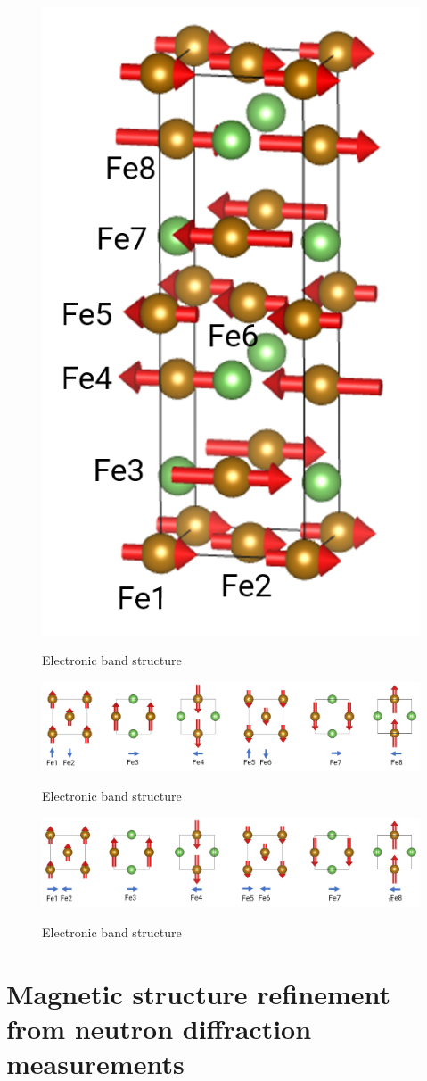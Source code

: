 \documentclass[11pt,edeposit,draftthesis]{uiucthesis2020}
\begin{document}
\begin{mainmatter}
\begin{figure}
\centering\includegraphics[width=0.3\columnwidth]{figures/ch2/Fe2As.png} \\
\caption{\label{fig:Fe2As}
Electronic band structure
}
\end{figure}

\begin{figure}
\centering\includegraphics[width=\columnwidth]{figures/ch2/fieldlike_torque_Fe2As.png} \\
\caption{\label{fig:fieldlike_torque_Fe2As}
Electronic band structure
}
\end{figure}

\begin{figure}
\centering\includegraphics[width=\columnwidth]{figures/ch2/antidamping_torque_Fe2As.png} \\
\caption{\label{fig:antidamping_torque_Fe2As}
Electronic band structure
}
\end{figure}


\Blindtext[6]

\chapter{Magnetic structure refinement from neutron diffraction measurements}


\end{mainmatter}
\end{document}

